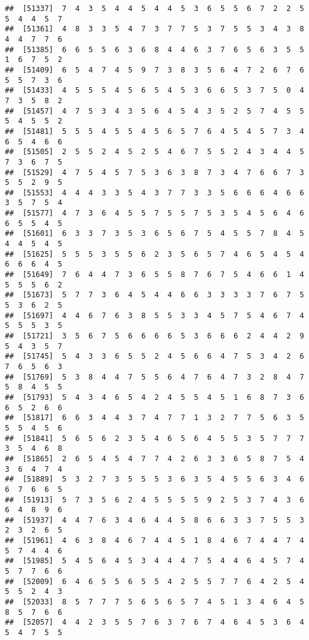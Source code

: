 \documentclass[
]{book}
\begin{document}
\begin{verbatim}
##  [51337]  7  4  3  5  4  4  5  4  4  5  3  6  5  5  6  7  2  2  5  5  4  4  5  7
##  [51361]  4  8  3  3  5  4  7  3  7  7  5  3  7  5  5  3  4  3  8  4  4  7  7  6
##  [51385]  6  6  5  5  6  3  6  8  4  4  6  3  7  6  5  6  3  5  5  1  6  7  5  2
##  [51409]  6  5  4  7  4  5  9  7  3  8  3  5  6  4  7  2  6  7  6  5  5  7  3  6
##  [51433]  4  5  5  5  4  5  6  5  4  5  3  6  6  5  3  7  5  0  4  7  3  5  8  2
##  [51457]  4  7  5  3  4  3  5  6  4  5  4  3  5  2  5  7  4  5  5  5  4  5  5  2
##  [51481]  5  5  5  4  5  5  4  5  6  5  7  6  4  5  4  5  7  3  4  6  5  4  6  6
##  [51505]  2  5  5  2  4  5  2  5  4  6  7  5  5  2  4  3  4  4  5  7  3  6  7  5
##  [51529]  4  7  5  4  5  7  5  3  6  3  8  7  3  4  7  6  6  7  3  5  5  2  9  5
##  [51553]  4  4  4  3  3  5  4  3  7  7  3  3  5  6  6  6  4  6  6  3  5  7  5  4
##  [51577]  4  7  3  6  4  5  5  7  5  5  7  5  3  5  4  5  6  4  6  6  5  5  4  5
##  [51601]  6  3  3  7  3  5  3  6  5  6  7  5  4  5  5  7  8  4  5  4  4  5  4  5
##  [51625]  5  5  5  3  5  5  6  2  3  5  6  5  7  4  6  5  4  5  4  6  6  6  4  5
##  [51649]  7  6  4  4  7  3  6  5  5  8  7  6  7  5  4  6  6  1  4  5  5  5  6  2
##  [51673]  5  7  7  3  6  4  5  4  4  6  6  3  3  3  3  7  6  7  5  5  3  6  2  5
##  [51697]  4  4  6  7  6  3  8  5  5  3  3  4  5  7  5  4  6  7  4  5  5  5  3  5
##  [51721]  3  5  6  7  5  6  6  6  6  5  3  6  6  6  2  4  4  2  9  5  4  3  5  7
##  [51745]  5  4  3  3  6  5  5  2  4  5  6  6  4  7  5  3  4  2  6  7  6  5  6  3
##  [51769]  5  3  8  4  4  7  5  5  6  4  7  6  4  7  3  2  8  4  7  5  8  4  5  5
##  [51793]  5  4  3  4  6  5  4  2  4  5  5  4  5  1  6  8  7  3  6  6  5  2  6  6
##  [51817]  6  6  3  4  4  3  7  4  7  7  1  3  2  7  7  5  6  3  5  5  5  4  5  6
##  [51841]  5  6  5  6  2  3  5  4  6  5  6  4  5  5  3  5  7  7  7  3  5  4  6  8
##  [51865]  2  6  5  4  5  4  7  7  4  2  6  3  3  6  5  8  7  5  4  3  6  4  7  4
##  [51889]  5  3  2  7  3  5  5  5  3  6  3  5  4  5  5  6  3  4  6  6  7  6  6  5
##  [51913]  5  7  3  5  6  2  4  5  5  5  5  9  2  5  3  7  4  3  6  6  4  8  9  6
##  [51937]  4  4  7  6  3  4  6  4  4  5  8  6  6  3  3  7  5  5  3  2  3  2  6  5
##  [51961]  4  6  3  8  4  6  7  4  4  5  1  8  4  6  7  4  4  7  4  5  7  4  4  6
##  [51985]  5  4  5  6  4  5  3  4  4  4  7  5  4  4  6  4  5  7  4  5  7  7  6  6
##  [52009]  6  4  6  5  5  6  5  5  4  2  5  5  7  7  6  4  2  5  4  5  5  2  4  3
##  [52033]  8  5  7  7  7  5  6  5  6  5  7  4  5  1  3  4  6  4  5  8  5  7  6  6
##  [52057]  4  4  2  3  5  5  7  6  3  7  6  7  4  6  4  5  3  6  4  5  4  7  5  5

\end{verbatim}
\end{document}
